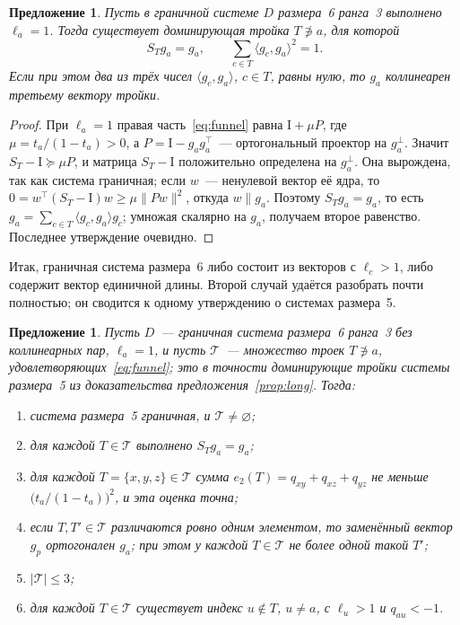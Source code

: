 \documentclass[11pt,a4paper]{article}
\theoremstyle{plain}
\newtheorem{proposition}[theorem]{Предложение}
\theoremstyle{definition}
\theoremstyle{remark}
\newcommand{\Id}{\mathrm{I}}
\newcommand{\T}{^{\!\top}}
\begin{document}
\begin{proposition}\label{prop:unit}
Пусть в граничной системе $D$ размера~6 ранга~3 выполнено $\ell_a=1$. Тогда
существует доминирующая тройка $T\not\ni a$, для которой
\[
  S_Tg_a=g_a,\qquad \sum_{c\in T}\langle g_c,g_a\rangle^2=1 .
\]
Если при этом два из трёх чисел $\langle g_c,g_a\rangle$, $c\in T$, равны
нулю, то $g_a$ коллинеарен третьему вектору тройки.
\end{proposition}
\begin{proof}
При $\ell_a=1$ правая часть~\eqref{eq:funnel} равна $\Id+\mu P$, где
$\mu=t_a/(1-t_a)>0$, а $P=\Id-g_ag_a\T$~--- ортогональный проектор на
$g_a^\perp$. Значит $S_T-\Id\succeq\mu P$, и матрица $S_T-\Id$ положительно
определена на $g_a^\perp$. Она вырождена, так как система граничная; если
$w$~--- ненулевой вектор её ядра, то $0=w\T(S_T-\Id)w\ge\mu\|Pw\|^2$, откуда
$w\parallel g_a$. Поэтому $S_Tg_a=g_a$, то есть
$g_a=\sum_{c\in T}\langle g_c,g_a\rangle g_c$; умножая скалярно на $g_a$,
получаем второе равенство. Последнее утверждение очевидно.
\end{proof}

Итак, граничная система размера~6 либо состоит из векторов с $\ell_c>1$,
либо содержит вектор единичной длины. Второй случай удаётся разобрать почти
полностью; он сводится к одному утверждению о системах размера~5.

\begin{proposition}\label{prop:unitbranch}
Пусть $D$~--- граничная система размера~6 ранга~3 без коллинеарных пар,
$\ell_a=1$, и пусть $\mathcal T$~--- множество троек $T\not\ni a$,
удовлетворяющих~\eqref{eq:funnel}; это в точности доминирующие тройки
системы размера~5 из доказательства предложения~\ref{prop:long}. Тогда:
\begin{enumerate}
\item[\textup{1)}] система размера~5 граничная, и $\mathcal T\ne\varnothing$;
\item[\textup{2)}] для каждой $T\in\mathcal T$ выполнено $S_Tg_a=g_a$;
\item[\textup{3)}] для каждой $T=\{x,y,z\}\in\mathcal T$ сумма
  $e_2(T)=q_{xy}+q_{xz}+q_{yz}$ не меньше $\bigl(t_a/(1-t_a)\bigr)^2$, и эта
  оценка точна;
\item[\textup{4)}] если $T,T'\in\mathcal T$ различаются ровно одним элементом,
  то заменённый вектор $g_p$ ортогонален $g_a$; при этом у каждой
  $T\in\mathcal T$ не более одной такой $T'$;
\item[\textup{5)}] $|\mathcal T|\le3$;
\item[\textup{6)}] для каждой $T\in\mathcal T$ существует индекс $u\notin T$,
  $u\ne a$, с $\ell_u>1$ и $q_{au}<-1$.
\end{enumerate}
\end{proposition}
\end{document}
